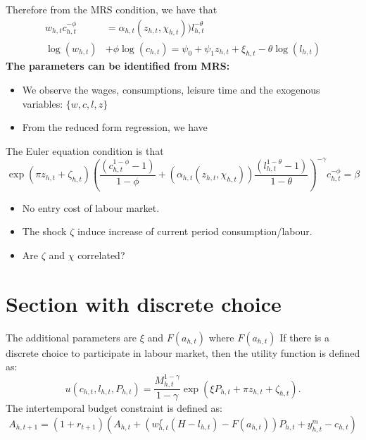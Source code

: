 Therefore from the MRS condition, we have that
\[\begin{split}
   w_{h,t}c_{h,t}^{-\phi} &= \alpha_{h,t}(z_{h,t},\chi_{h,t})) l_{h,t}^{-\theta}  \\
   \log(w_{h,t})& + \phi \log(c_{h,t})  = \psi_0 + \psi_1 z_{h,t} + \xi_{h,t} - \theta \log(l_{h,t})
\end{split} \]
\textbf{The parameters can be identified from MRS:}
\begin{itemize}
  \item We observe the wages, consumptions, leisure time and the exogenous variables: $\{w,c,l,z\}$
  \item From the reduced form regression, we have
\end{itemize}
The Euler equation condition is that
\[ \exp{( \pi z_{h,t} + \zeta_{h,t} )} \left( \frac{(c_{h,t}^{1 - \phi} - 1)}{1 - \phi} + (\alpha_{h,t}(z_{h,t},\chi_{h,t})) \frac{(l_{h,t}^{1 - \theta} -1)}{ 1 - \theta}\right)^{-\gamma} c_{h,t}^{-\phi} = \beta \]
\begin{itemize}
  \item No entry cost of labour market.
  \item The shock $\zeta$ induce increase of current period consumption/labour.
  \item Are $\zeta$ and $\chi$ correlated?
\end{itemize}

\section{Section with discrete choice}
The additional parameters are $\xi$ and $F(a_{h,t})$ where $F(a_{h,t})$
If there is a discrete choice to participate in labour market, then the utility function is defined as:
\[ u(c_{h,t},l_{h,t},P_{h,t}) = \frac{M^{1-\gamma}_{h,t}}{1 - \gamma} \exp{(\xi P_{h,t} + \pi z_{h,t} + \zeta_{h,t} )} .\]
The intertemporal budget constraint is defined as:
\[ A_{h,t+1} = (1 + r_{t+1}) \left( A_{h,t} + \left(w_{h,t}^f(H-l_{h,t}) - F(a_{h,t}) \right)P_{h,t} + y_{h,t}^m - c_{h,t} \right)\]
